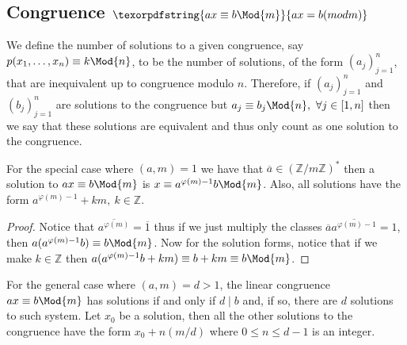 \subsection{Congruence \(\texorpdfstring{ax \equiv b \Mod{m}}{ax = b (mod m)}\)}

\begin{definition}
    We define the number of solutions to a given congruence, say
    \(p(x_1, \dots, x_n) \equiv k \Mod{n}\), to be the number of solutions, of
    the form \((a_j)_{j=1}^n\), that are inequivalent up to congruence modulo
    \(n\). Therefore, if \((a_j)_{j=1}^n\) and \((b_j)_{j = 1}^{n}\) are
    solutions to the congruence but \(a_j \equiv b_j \Mod{n},\ \forall j \in [1,
        n]\) then we say that these solutions are equivalent and thus only count as
    one solution to the congruence.
\end{definition}

\begin{proposition}
    For the special case where \((a, m) = 1\) we have that \(\overline{a} \in
    (\mathbb{Z}/m\mathbb{Z})^\ast\) then a solution to \(ax \equiv b \Mod{m}\) is
    \(x \equiv a^{\varphi(m) - 1} b \Mod{m}\). Also, all solutions have the form
    \(a^{\varphi(m)-1} + km,\ k \in \mathbb{Z}\).
\end{proposition}

\begin{proof}
    Notice that \(\overline{a^{\varphi(m)}} = \overline{1}\) thus if we just
    multiply the classes \(\overline{a} \overline{a^{\varphi(m) - 1}} = 1\), then
    \(a (a^{\varphi(m) - 1} b) \equiv b \Mod{m}\). Now for the solution forms,
    notice that if we make \(k \in \mathbb{Z}\) then \(a (a^{\varphi(m) - 1}b +
    km) \equiv b + km \equiv b \Mod{m}\).
\end{proof}

\begin{proposition}
    For the general case where \((a,m) = d > 1\), the linear congruence \(ax
    \equiv b \Mod{m}\) has solutions if and only if \(d \mid b\) and, if so,
    there are \(d\) solutions to such system.  Let \(x_0\) be a solution, then
    all the other solutions to the congruence have the form \(x_0 + n (m/d)\)
    where \(0 \leqslant n \leqslant d-1\) is an integer.
\end{proposition}

